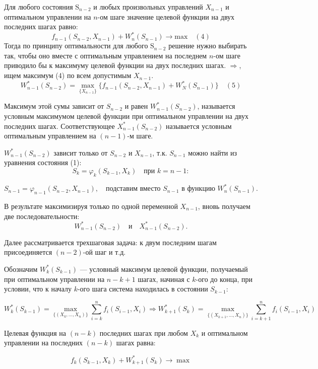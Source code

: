 \documentclass[17pt]{extarticle}
\begin{document}
Для любого состояния \( \text{S}_{n-2} \) и любых произвольных управлений \( X_{n-1} \)
и оптимальном управлении на \( n \)-ом шаге значение целевой функции на двух последних шагах равно:
\[
    f_{n-1}(S_{n-2}, X_{n-1}) + W_n^*(S_{n-1}) \rightarrow \text{max} \quad (4)
\]
Тогда по принципу оптимальности для любого \( \text{S}_{n-2} \) решение нужно выбирать так,
чтобы оно вместе с оптимальным управлением на последнем \( n \)-ом шаге приводило бы к максимуму целевой функции на двух последних шагах.
$\Rightarrow$, ищем максимум (4) по всем допустимым $X_{n-1}$.
\[
    W_{n-1}^*(S_{n-2})=\max_{\{X_{n-1}\}}\{f_{n-1}(S_{n-2}, X_{n-1}) + W_N^*(S_{n-1})\} \quad (5)
\]

Максимум этой сумы зависит от $S_{n-2}$ и равен $W_{n-1}^*(S_{n-2})$,
называется \\ условным максимумом целевой функции при оптимальном управлении на двух последних шагах.
Соответствующее $X_{n-1}^*(S_{n-2})$ называется условным оптимальным управлением на $(n-1)$-м шаге.

\( W_{n-1}^*(S_{n-2}) \) зависит только от \( S_{n-2} \) и \( X_{n-1} \), т.к. \( S_{n-1} \) можно найти из уравнения состояния (1):
\[
    S_k = \varphi_k(S_{k-1}, X_k) \quad \text{при } k = n-1:
\]

\[
    S_{n-1} = \varphi_{n-1}(S_{n-2}, X_{n-1}), \quad \text{подставим вместо } S_{n-1} \text{ в функцию } W_n^*(S_{n-1}).
\]

В результате максимизируя только по одной переменной \( X_{n-1} \), вновь получаем две последовательности:
\[
    W_{n-1}^*(S_{n-2}) \quad \text{и} \quad X_{n-1}^*(S_{n-2}).
\]

Далее рассматривается трехшаговая задача: к двум последним шагам присоединяется \( (n-2) \)-ой шаг и т.д.

Обозначим \( W_k^*(S_{k-1}) \) — условный максимум целевой функции,
получаемый при оптимальном управлении на \( n - k + 1 \) шагах, начиная с \( k \)-ого до конца, при условии,
что к началу \( k \)-ого шага система находилась в состоянии \( S_{k-1} \):

\[
    W_k^*(S_{k-1}) = \max_{\{(X_k, \ldots, X_n)\}} \sum_{i=k}^n f_i(S_{i-1}, X_i) \Rightarrow W_{k+1}^*(S_k) = \max_{\{(X_{k+1}, \ldots, X_n)\}} \sum_{i=k+1}^n f_i(S_{i-1}, X_i)
\]

Целевая функция на \( (n - k) \) последних шагах при любом \( X_k \) и оптимальном управлении на последних \( (n - k) \) шагах равна:

\[
    f_k(S_{k-1}, X_k) + W_{k+1}^*(S_k) \rightarrow \max
\]
\end{document}

